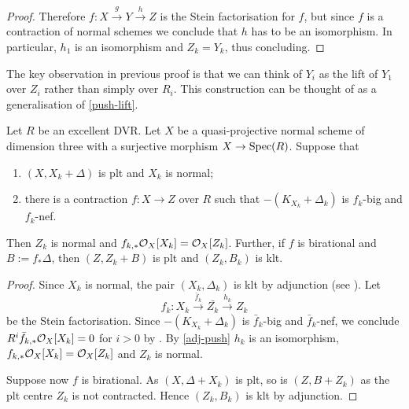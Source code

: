 \begin{proof}
		Therefore $f \colon X \xrightarrow{g} Y \xrightarrow{h} Z$ is the Stein factorisation for $f$, but since $f$ is a contraction of normal schemes we conclude that $h$ has to be an isomorphism.
		In particular, $h_1$ is an isomorphism and $Z_{k}=Y_{k}$, thus concluding.
	\end{proof}
	
	
	\begin{remark}
		The key observation in previous proof is that we can think of $Y_{i}$ as the lift of $Y_{1}$ over $Z_{i}$ rather than simply over $R_{i}$. This construction can be thought of as a generalisation of \autoref{push-lift}.
	\end{remark}
	
	
	\begin{lemma}\label{invAdj2}
		Let $R$ be an excellent DVR.
		Let $X$ be a quasi-projective normal scheme of dimension three with a surjective morphism $X \to \operatorname{Spec}(R)$. Suppose that
		\begin{enumerate}
			\item $(X, X_k+\Delta)$ is plt and $X_k$ is normal;
			\item there is a contraction $f \colon X \to Z$ over $R$ such that $-(K_{X_{k}}+\Delta_{k})$ is $f_{k}$-big and $f_k$-nef.
		\end{enumerate}  
	Then $Z_{k}$ is normal and $f_{k,*}\mathcal{O}_{X}[X_{k}]=\mathcal{O}_{X}[Z_{k}]$. Further, if $f$ is birational and $B:=f_{*}\Delta$, then $(Z, Z_k+B)$ is plt and $(Z_{k},B_{k})$ is klt.
	\end{lemma}
	
	\begin{proof}
		Since $X_{k}$ is normal, the pair $(X_{k},\Delta_{k})$ is klt by adjunction (see \cite[Lemma 4.8]{kk-singbook}). 
		Let $$f_{k}\colon X_{k} \xrightarrow{\bar{f}_{k}} \bar{Z_k} \xrightarrow{h_k} Z_{k}$$ be the Stein factorisation. 
		Since $-(K_{X_{k}}+\Delta_{k})$ is $\bar{f}_{k}$-big and $\bar{f}_{k}$-nef, we conclude $R^{i}\bar{f}_{k,*}\mathcal{O}_{X}[X_{k}]=0$ for $i> 0$ by \cite[Proposition 3.2]{Tan18}.
		By \autoref{adj-push} $h_k$ is an isomorphism, $f_{k,*}\mathcal{O}_{X}[X_{k}]=\mathcal{O}_{X}[Z_{k}]$ and $Z_{k}$ is normal.
		
		Suppose now $f$ is birational. As $(X,\Delta+X_k)$ is plt, so is $(Z,B+Z_k)$ as the plt centre $Z_k$ is not contracted. Hence $(Z_k,B_k)$ is klt by adjunction.			\end{proof}
	
